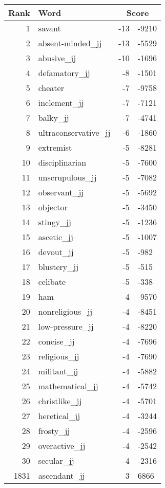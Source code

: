 \begin{longtable}[!htbp]{| rlr@{.}l |}
    \hline
    \textbf{Rank} & \textbf{Word} & \multicolumn{2}{c|}{\textbf{Score}} \\
    \hline
    \endhead
    1 & savant & -13 & -9210 \\
    2 & absent-minded\_jj & -13 & -5529 \\
    3 & abusive\_jj & -10 & -1696 \\
    4 & defamatory\_jj & -8 & -1501 \\
    5 & cheater & -7 & -9758 \\
    6 & inclement\_jj & -7 & -7121 \\
    7 & balky\_jj & -7 & -4741 \\
    8 & ultraconservative\_jj & -6 & -1860 \\
    9 & extremist & -5 & -8281 \\
    10 & disciplinarian & -5 & -7600 \\
    11 & unscrupulous\_jj & -5 & -7082 \\
    12 & observant\_jj & -5 & -5692 \\
    13 & objector & -5 & -3450 \\
    14 & stingy\_jj & -5 & -1236 \\
    15 & ascetic\_jj & -5 & -1007 \\
    16 & devout\_jj & -5 & -982 \\
    17 & blustery\_jj & -5 & -515 \\
    18 & celibate & -5 & -338 \\
    19 & ham & -4 & -9570 \\
    20 & nonreligious\_jj & -4 & -8451 \\
    21 & low-pressure\_jj & -4 & -8220 \\
    22 & concise\_jj & -4 & -7696 \\
    23 & religious\_jj & -4 & -7690 \\
    24 & militant\_jj & -4 & -5882 \\
    25 & mathematical\_jj & -4 & -5742 \\
    26 & christlike\_jj & -4 & -5701 \\
    27 & heretical\_jj & -4 & -3244 \\
    28 & frosty\_jj & -4 & -2596 \\
    29 & overactive\_jj & -4 & -2542 \\
    30 & secular\_jj & -4 & -2316 \\
    1831 & ascendant\_jj & 3 & 6866 \\

\end{longtable}
